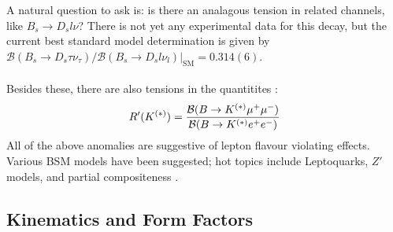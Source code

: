 \documentclass[a4paper,10pt]{article}
\numberwithin{equation}{section}
\begin{document}
A natural question to ask is: is there an analagous tension in related channels, like $B_s\to D_s l\nu$? There is not yet any experimental data for this decay, but the current best standard model determination is given by ${\mathcal{B}(B_s\to D_s \tau \nu_{\tau}) / \mathcal{B}(B_s\to D_s l \nu_l)} |_{\text{SM}} = 0.314(6)$.
\\ \\
Besides these, there are also tensions in the quantitites \cite{Altmannshofer:2017yso}:
\begin{align}
	R'(K^{(*)}) = {\mathcal{B}( B\to K^{(*)}\mu^+\mu^-)\over \mathcal{B}( B\to K^{(*)} e^+e^-)}
\end{align}
All of the above anomalies are suggestive of lepton flavour violating effects. Various BSM models have been suggested; hot topics include Leptoquarks, $Z'$ models, and partial compositeness \cite{Altmannshofer:2017yso}.

\subsection{Kinematics and Form Factors}
\label{sec:formfactors}
\end{document}

